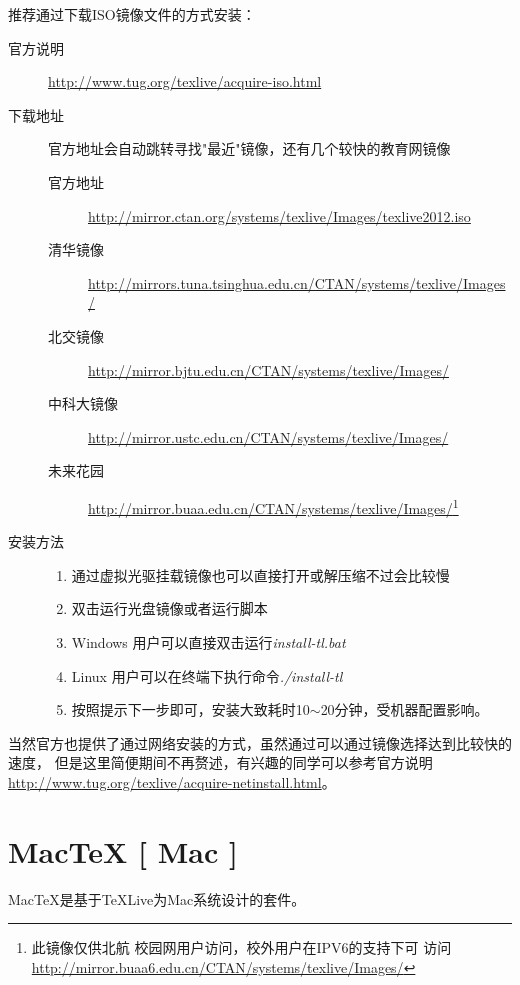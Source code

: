 推荐通过下载ISO镜像文件的方式安装：
\begin{description}
    \item[官方说明]
        \url{http://www.tug.org/texlive/acquire-iso.html}
    \item[下载地址] 官方地址会自动跳转寻找"最近"镜像，还有几个较快的教育网镜像
    \begin{description}
        \item[官方地址]
            \url{http://mirror.ctan.org/systems/texlive/Images/texlive2012.iso}
        \item[清华镜像]
            \url{http://mirrors.tuna.tsinghua.edu.cn/CTAN/systems/texlive/Images/}
        \item[北交镜像]
            \url{http://mirror.bjtu.edu.cn/CTAN/systems/texlive/Images/}
        \item[中科大镜像]
            \url{http://mirror.ustc.edu.cn/CTAN/systems/texlive/Images/}
        \item[未来花园]
            \url{http://mirror.buaa.edu.cn/CTAN/systems/texlive/Images/}\footnote{此镜像仅供北航
            校园网用户访问，校外用户在IPV6的支持下可
            访问\url{http://mirror.buaa6.edu.cn/CTAN/systems/texlive/Images/}}
    \end{description}
    \item[安装方法] \hfill
    \begin{enumerate}
        \item 通过虚拟光驱挂载镜像也可以直接打开或解压缩不过会比较慢
        \item 双击运行光盘镜像或者运行脚本
        \item[] Windows 用户可以直接双击运行\textsl{install-tl.bat}
        \item[] Linux 用户可以在终端下执行命令\textsl{./install-tl}
        \item 按照提示下一步即可，安装大致耗时10$\sim$20分钟，受机器配置影响。
    \end{enumerate}
\end{description}

当然官方也提供了通过网络安装的方式，虽然通过可以通过镜像选择达到比较快的速度，
但是这里简便期间不再赘述，有兴趣的同学可以参考官方说明
\url{http://www.tug.org/texlive/acquire-netinstall.html}。

\section{Mac\TeX{} [ Mac ]}

Mac\TeX{}是基于\TeX{}Live为Mac系统设计的套件。

